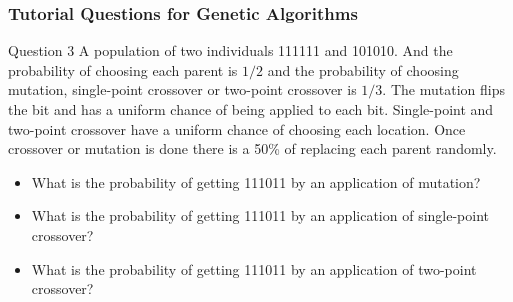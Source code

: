 \documentclass[aspectratio=169, 10pt]{beamer}
\begin{document}
\begin{frame}
    \frametitle{Tutorial Questions for Genetic Algorithms}

    \begin{block}{Question 3}
        A population of two individuals 111111 and 101010. 
        And the probability of choosing each parent is $1/2$ and the probability of choosing mutation, 
        single-point crossover or two-point crossover is $1/3$. 
        The mutation flips the bit and has a uniform chance of being applied to each bit. 
        Single-point and two-point crossover have a uniform chance of choosing each location. 
        Once crossover or mutation is done there is a 50\% of replacing each parent randomly.
    \end{block}

    \begin{itemize}
        \item What is the probability of getting 111011 by an application of mutation?
        \item What is the probability of getting 111011 by an application of single-point crossover?
        \item What is the probability of getting 111011 by an application of two-point crossover?
    \end{itemize}
    
\end{frame}
\end{document}
